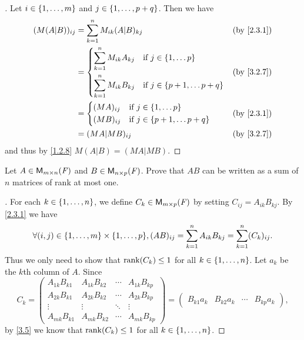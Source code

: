 \begin{proof}[]
	Let \(i \in \left\lbrace1, \dots, m\right\rbrace\) and \(j \in \left\lbrace1, \dots, p + q\right\rbrace\).
	Then we have
	\begin{align*}
		(M (A | B))_{i j} & = \sum_{k = 1}^n M_{i k} (A | B)_{k j}                                        &  & \by{2.3.1} \\
		                  & = \begin{dcases}
			                      \sum_{k = 1}^n M_{i k} A_{k j} & \text{if } j \in \set{1, \dots p}         \\
			                      \sum_{k = 1}^n M_{i k} B_{k j} & \text{if } j \in \set{p + 1, \dots p + q}
		                      \end{dcases} &  & \by{3.2.7}                  \\
		                  & = \begin{dcases}
			                      (MA)_{i j} & \text{if } j \in \set{1, \dots p}         \\
			                      (MB)_{i j} & \text{if } j \in \set{p + 1, \dots p + q}
		                      \end{dcases}                     &  & \by{2.3.1}                                      \\
		                  & = (MA | MB)_{i j}                                                             &  & \by{3.2.7}
	\end{align*}
	and thus by \cref{1.2.8} \(M (A | B) = (MA | MB)\).
\end{proof}

\setcounter{ex}{17}
\begin{ex}\label{ex:3.2.18}
	Let \(A \in \mathsf{M}_{{m} \times n}({\mathit{F}})\) and \(B \in \mathsf{M}_{{n} \times p}({\mathit{F}})\).
	Prove that \(AB\) can be written as a sum of \(n\) matrices of rank at most one.
\end{ex}

\begin{proof}[]
	For each \(k \in \left\lbrace1, \dots, n\right\rbrace\), we define \(C_k \in \mathsf{M}_{{m} \times p}({\mathit{F}})\) by setting \(C_{i j} = A_{i k} B_{k j}\).
	By \cref{2.3.1} we have
	\[
		\forall (i, j) \in \set{1, \dots, m} \times \set{1, \dots, p}, (AB)_{i j} = \sum_{k = 1}^n A_{i k} B_{k j} = \sum_{k = 1}^n (C_k)_{i j}.
	\]
	Thus we only need to show that \(\rk{C_k} \leq 1\) for all \(k \in \left\lbrace1, \dots, n\right\rbrace\).
	Let \(a_k\) be the \(k\)th column of \(A\).
	Since
	\[
		C_k = \begin{pmatrix}
			A_{1 k} B_{k 1} & A_{1 k} B_{k 2} & \cdots & A_{1 k} B_{k p} \\
			A_{2 k} B_{k 1} & A_{2 k} B_{k 2} & \cdots & A_{2 k} B_{k p} \\
			\vdots          & \vdots          & \ddots & \vdots          \\
			A_{m k} B_{k 1} & A_{m k} B_{k 2} & \cdots & A_{m k} B_{k p}
		\end{pmatrix} = \begin{pmatrix}
			B_{k 1} a_k & B_{k 2} a_k & \cdots & B_{k p} a_k
		\end{pmatrix},
	\]
	by \cref{3.5} we know that \(\rk{C_k} \leq 1\) for all \(k \in \left\lbrace1, \dots, n\right\rbrace\).
\end{proof}

